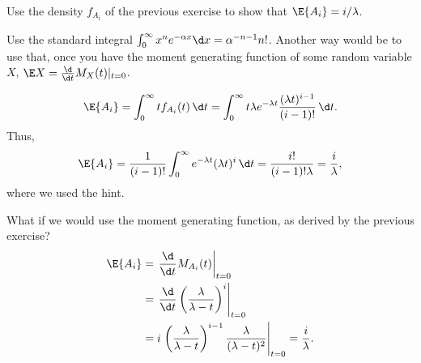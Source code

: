 \begin{exercise}
  Use the density $f_{A_i}$ of the previous exercise to show that $\E{A_i}=i/\lambda$. 
  \begin{hint}
Use the standard integral 
    $\int_0^\infty x^n e^{-\alpha x} \d x =
    \alpha^{-n-1}n!$. 
    Another way would be to use that, once you have the moment
    generating function of some random variable $X$,
    $\E X = \frac{\d}{\d t} M_X(t) |_{t=0}$. 
  \end{hint}
\begin{solution}
  \begin{equation*}
\E{A_i} = \int_0^\infty t f_{A_i} (t) \, \d t  = 
\int_0^\infty t  \lambda e^{-\lambda t} \frac{(\lambda t)^{i-1}}{(i-1)!}\, \d t.
  \end{equation*}
Thus, 
  \begin{equation*}
\E{A_i} = \frac{1}{(i-1)!} \int_0^\infty   e^{-\lambda t} (\lambda t)^i\,\d t = \frac{i!}{(i-1)!\lambda}=\frac{i}\lambda,
  \end{equation*}
  where we used the hint.

What if we would use the moment generating function, as derived by the previous exercise?
\begin{align*}
    \E{A_i} 
&= \left.\frac{\d}{\d t} M_{A_i}(t)\right|_{t=0} \\
&= \left.\frac{\d}{\d t} \left(\frac{\lambda}{\lambda-t}\right)^i\right|_{t=0} \\
&= i \left.\left(\frac{\lambda}{\lambda-t}\right)^{i-1}\frac{\lambda}{(\lambda-t)^2}\right|_{t=0} 
= \frac i\lambda.
\end{align*}


\end{solution}
\end{exercise}

\begin{comment}
\begin{exercise}
  Assume a timer fires at times $0=T_0<T_1<T_2< \cdots$, such that
  $T_{k}-T_{k-1}\sim\exp(\lambda)$. Define
  $N(t) = \sum_{k=0}^\infty k \1{T_k \leq t < T_{k+1}}$, 
What is the
  distribution of $N(t)$?
\begin{solution}
$N(t) \sim \text{P}(\lambda t)$. 
\end{solution}
\end{exercise}
\end{comment}
  
